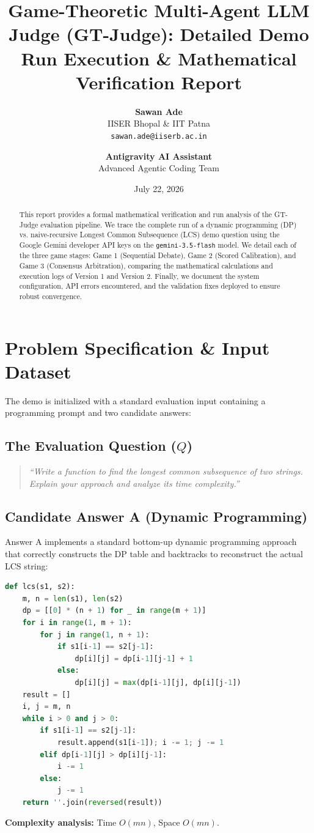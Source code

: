 \documentclass[11pt]{article}
\title{\textbf{Game-Theoretic Multi-Agent LLM Judge (GT-Judge): Detailed Demo Run Execution \& Mathematical Verification Report}}
\author{\textbf{Sawan Ade} \\ IISER Bhopal \& IIT Patna \\ \texttt{sawan.ade@iiserb.ac.in} \and \textbf{Antigravity AI Assistant} \\ Advanced Agentic Coding Team}
\date{July 22, 2026}
\begin{document}
\maketitle

\begin{abstract}
This report provides a formal mathematical verification and run analysis of the GT-Judge evaluation pipeline. We trace the complete run of a dynamic programming (DP) vs. naive-recursive Longest Common Subsequence (LCS) demo question using the Google Gemini developer API keys on the \texttt{gemini-3.5-flash} model. We detail each of the three game stages: Game 1 (Sequential Debate), Game 2 (Scored Calibration), and Game 3 (Consensus Arbitration), comparing the mathematical calculations and execution logs of Version 1 and Version 2. Finally, we document the system configuration, API errors encountered, and the validation fixes deployed to ensure robust convergence.
\end{abstract}

\newpage

\section{Problem Specification \& Input Dataset}
The demo is initialized with a standard evaluation input containing a programming prompt and two candidate answers:

\subsection{The Evaluation Question ($Q$)}
\begin{quote}
\textit{``Write a function to find the longest common subsequence of two strings. Explain your approach and analyze its time complexity.''}
\end{quote}

\subsection{Candidate Answer A (Dynamic Programming)}
Answer A implements a standard bottom-up dynamic programming approach that correctly constructs the DP table and backtracks to reconstruct the actual LCS string:
\begin{lstlisting}[language=Python]
def lcs(s1, s2):
    m, n = len(s1), len(s2)
    dp = [[0] * (n + 1) for _ in range(m + 1)]
    for i in range(1, m + 1):
        for j in range(1, n + 1):
            if s1[i-1] == s2[j-1]:
                dp[i][j] = dp[i-1][j-1] + 1
            else:
                dp[i][j] = max(dp[i-1][j], dp[i][j-1])
    result = []
    i, j = m, n
    while i > 0 and j > 0:
        if s1[i-1] == s2[j-1]:
            result.append(s1[i-1]); i -= 1; j -= 1
        elif dp[i-1][j] > dp[i][j-1]:
            i -= 1
        else:
            j -= 1
    return ''.join(reversed(result))
\end{lstlisting}
\textbf{Complexity analysis:} Time $O(mn)$, Space $O(mn)$.
\end{document}
